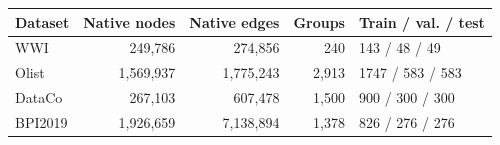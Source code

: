 \begin{tabular}{lrrrl}
\toprule
Dataset & Native nodes & Native edges & Groups & Train / val. / test \\
\midrule
WWI & 249,786 & 274,856 & 240 & 143 / 48 / 49 \\
Olist & 1,569,937 & 1,775,243 & 2,913 & 1747 / 583 / 583 \\
DataCo & 267,103 & 607,478 & 1,500 & 900 / 300 / 300 \\
BPI2019 & 1,926,659 & 7,138,894 & 1,378 & 826 / 276 / 276 \\
\bottomrule
\end{tabular}
